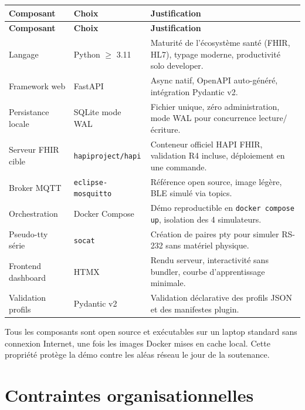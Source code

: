 \bridgezebra
\begin{longtable}{p{4cm}p{4.5cm}p{6.5cm}}
  \toprule
  \rowcolor{bridgeblue!90}
  {\color{white}\bfseries Composant} & {\color{white}\bfseries Choix} & {\color{white}\bfseries Justification} \\
  \midrule
  \endfirsthead
  \toprule
  \rowcolor{bridgeblue!90}
  {\color{white}\bfseries Composant} & {\color{white}\bfseries Choix} & {\color{white}\bfseries Justification} \\
  \midrule
  \endhead
  \bottomrule
  \endfoot
  Langage             & Python $\geq$ 3.11             & Maturité de l'écosystème santé (FHIR, HL7), typage moderne, productivité solo developer. \\
  Framework web       & FastAPI                        & Async natif, OpenAPI auto-généré, intégration Pydantic v2. \\
  Persistance locale  & SQLite mode WAL                & Fichier unique, zéro administration, mode WAL pour concurrence lecture/écriture. \\
  Serveur FHIR cible  & \texttt{hapiproject/hapi}      & Conteneur officiel HAPI FHIR, validation R4 incluse, déploiement en une commande. \\
  Broker MQTT         & \texttt{eclipse-mosquitto}     & Référence open source, image légère, BLE simulé via topics. \\
  Orchestration       & Docker Compose                 & Démo reproductible en \texttt{docker compose up}, isolation des 4 simulateurs. \\
  Pseudo-tty série    & \texttt{socat}                 & Création de paires pty pour simuler RS-232 sans matériel physique. \\
  Frontend dashboard  & HTMX                           & Rendu serveur, interactivité sans bundler, courbe d'apprentissage minimale. \\
  Validation profils  & Pydantic v2                    & Validation déclarative des profils JSON et des manifestes plugin. \\
\end{longtable}

Tous les composants sont open source et exécutables sur un laptop standard sans connexion Internet, une fois les images Docker mises en cache local. Cette propriété protège la démo contre les aléas réseau le jour de la soutenance.

\section{Contraintes organisationnelles}
\label{sec:contraintes-organisationnelles}

